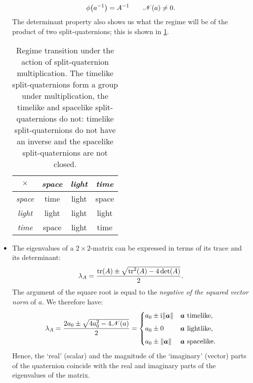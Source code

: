 \begin{itemize}
\begin{equation}
             \phi\qty(a^{-1}) = A^{-1} \qquad \mathscr{N}(a) \neq 0.
        \end{equation}
    The determinant property also shows us what the regime will be of the product of two split-quaternions; this is shown in \cref{tab:multiplication_class}.
        \begin{table}[h!]
        \centering
        \caption{Regime transition under the action of split-quaternion multiplication. The timelike split-quaternions form a group under multiplication, the timelike and spacelike split-quaternions do not: timelike split-quaternions do not have an inverse and the spacelike split-quaternions are not closed.}
        \label{tab:multiplication_class}
        \begin{tabular}{c|ccc}
            \toprule
            \(\times\) & \emph{space} & \emph{light} & \emph{time} \\[1mm]
            \hline
            \emph{space} & time  & light & space \\
            \emph{light} & light & light & light \\
            \emph{time} &  space & light & time \\
            \bottomrule
        \end{tabular}
        \end{table}
    \item The eigenvalues of a \(2\times2\)-matrix can be expressed in terms of its trace and its determinant:
        \begin{equation}
             \lambda_A = \frac{\trace(A) \pm \sqrt{\trace^2(A) - 4\det(A)}}{2}.
        \end{equation}
        The argument of the square root is equal to the \emph{negative of the squared vector norm} of \(a\). We therefore have:
        \begin{equation}
            \lambda_A = \frac{2a_0 \pm \sqrt{4 a_0^2 - 4\mathscr{N}(a)}}{2} = 
            \begin{cases}
                a_0 \pm \ii\norm{\vec{a}} & \vec{a} \text{ timelike},\\[1ex]
                a_0 \pm 0  & \vec{a} \text{ lightlike},\\[1ex]
                a_0 \pm \norm{\vec{a}} & \vec{a} \text{ spacelike}.\\
            \end{cases}
            \label{eq:quat_eigvals}
        \end{equation}
        Hence, the `real' (scalar) and the magnitude of the `imaginary' (vector) parts of the quaternion coincide with the real and imaginary parts of the eigenvalues of the matrix.
\end{itemize}

